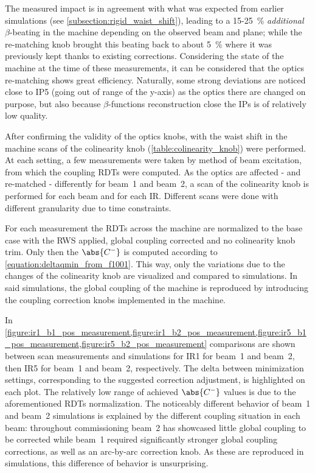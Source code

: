 The measured impact is in agreement with what was expected from earlier simulations (see \cref{subsection:rigid_waist_shift}), leading to a \num{15}-\qty{25}{\percent} \textit{additional} \(\beta\)-beating in the machine depending on the observed beam and plane; while the re-matching knob brought this beating back to about \qty{5}{\percent} where it was previously kept thanks to existing corrections.
Considering the state of the machine at the time of these measurements, it can be considered that the optics re-matching shows great efficiency.
Naturally, some strong deviations are noticed close to IP\num{5} (going out of range of the y-axis) as the optics there are changed on purpose, but also because \(\beta\)-functions reconstruction close the IPs is of relatively low quality.

After confirming the validity of the optics knobs, with the waist shift in the machine scans of the colinearity knob (\cref{table:colinearity_knob}) were performed.
At each setting, a few measurements were taken by method of beam excitation, from which the coupling RDTs were computed.
As the optics are affected - and re-matched - differently for beam~\num{1} and beam~\num{2}, a scan of the colinearity knob is performed for each beam and for each IR.
Different scans were done with different granularity due to time constraints.

For each measurement the RDTs across the machine are normalized to the base case with the RWS applied, global coupling corrected and no colinearity knob trim.
Only then the \(\abs{C^{-}}\) is computed according to \cref{equation:deltaqmin_from_f1001}.
This way, only the variations due to the changes of the colinearity knob are visualized and compared to simulations.
In said simulations, the global coupling of the machine is reproduced by introducing the coupling correction knobs implemented in the machine.
\newline

In \cref{figure:ir1_b1_pos_measurement,figure:ir1_b2_pos_measurement,figure:ir5_b1_pos_measurement,figure:ir5_b2_pos_measurement} comparisons are shown between scan measurements and simulations for IR\num{1} for beam~\num{1} and beam~\num{2}, then IR\num{5} for beam~\num{1} and beam~\num{2}, respectively.
The delta between minimization settings, corresponding to the suggested correction adjustment, is highlighted on each plot.
The relatively low range of achieved \(\abs{C^{-}}\) values is due to the aforementioned RDTs normalization.
The noticeably different behavior of beam~\num{1} and beam~\num{2} simulations is explained by the different coupling situation in each beam: throughout commissioning beam~\num{2} has showcased little global coupling to be corrected while beam~\num{1} required significantly stronger global coupling corrections, as well as an arc-by-arc correction knob.
As these are reproduced in simulations, this difference of behavior is unsurprising.

